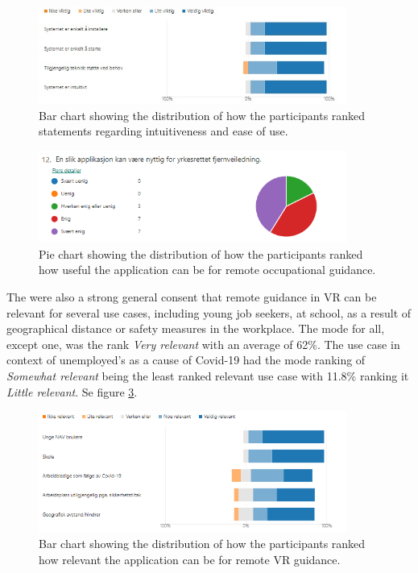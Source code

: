 \begin{figure}[H]
  \centering
   \captionsetup{width=.8\linewidth}
    \includegraphics[width=0.9\textwidth]{fig/phase_3/survey/EaseOfUse.jpg}
 \caption{Bar chart showing the distribution of how the participants ranked statements regarding intuitiveness and ease of use.}
\label{fig:phase3_Intuitiveness}
\end{figure}

\begin{figure}[H]
  \centering
   \captionsetup{width=.8\linewidth}
    \includegraphics[width=0.9\textwidth]{fig/phase_3/survey/remoteUsage.PNG}
 \caption{Pie chart showing the distribution of how the participants ranked how useful the application can be for remote occupational guidance.}
\label{fig:phase3_AppBeUsed}
\end{figure}


The were also a strong general consent that remote guidance in VR can be relevant for several use cases, including young job seekers, at school, as a result of geographical distance or 
safety measures in the workplace. The mode for all, except one, was the rank \textit{Very relevant} with an average of 62\%. The use case in context of unemployed's as a cause of Covid-19 had the mode ranking of \textit{Somewhat relevant} being the least ranked relevant use case with 11.8\%  ranking it \textit{Little relevant}. Se figure \ref{fig:phase3_RemoteUsecases}.    

\begin{figure}[H]
  \centering
   \captionsetup{width=.8\linewidth}
    \includegraphics[width=0.9\textwidth]{fig/phase_3/survey/RemoteUseCases.PNG}
 \caption{Bar chart showing the distribution of how the participants ranked how relevant the application can be for remote VR guidance.}
\label{fig:phase3_RemoteUsecases}
\end{figure}


